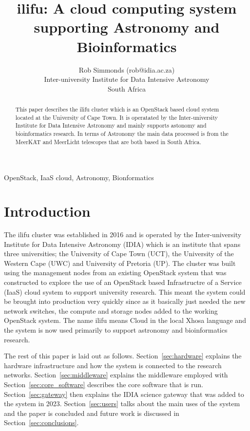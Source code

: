 \documentclass[12pt,twocolumn,a4paper]{article}
\title{ilifu: A cloud computing system supporting Astronomy and Bioinformatics}
\author{Rob Simmonds (rob@idia.ac.za) \\ Inter-university Institute for Data Intensive Astronomy \\ South Africa}
\date{}
\begin{document}
\maketitle

\begin{abstract}
   
This paper describes the ilifu cluster which is an OpenStack based cloud system located at the University of Cape Town. 
It is operatated by the Inter-university Institute for Data Intensive Astronomy and mainly supports 
astonomy and bioinformatics research. In terms of Astronomy the main data processed is from the MeerKAT and MeerLicht 
telescopes that are both based in South Africa.

 \end{abstract}

  OpenStack, IaaS cloud, Astronomy, Bionformatics

\section{Introduction}
 
The ilifu cluster was established in 2016 and 
is operated by the Inter-university Institute for Data Intensive Astronomy (IDIA) which is an
institute that spans three universities; the University of Cape Town (UCT), 
the University of the 
Western Cape (UWC) and University of Pretoria (UP).
The cluster was built using the management nodes from an 
existing OpenStack system that was constructed to explore the 
use of an OpenStack based Infrastructre of a Service (IaaS) cloud system to support university research. 
This meant the
system could be brought into production very quickly since as it basically just needed the new
network switches, the compute and storage nodes added to the working OpenStack system.
The name ilifu means
Cloud in the local Xhosa language and the system is now used primarily to support
astronomy and bioinformatics research.

The rest of this paper is laid out as follows. Section~\ref{sec:hardware}
 explains the hardware infrastructure and how
the system is connected to the research networks. Section~\ref{sec:middleware} 
explains the middleware employed with 
Section~\ref{sec:core_software} describes the core software that is run.
Section~\ref{sec:gateway} then explains the IDIA
science gateway that was added to the system in 2023. Section~\ref{sec:users}
talks about the main uses of the system and 
the paper is concluded and future work is discussed in
Section~\ref{sec:conclusions}.
\end{document}

